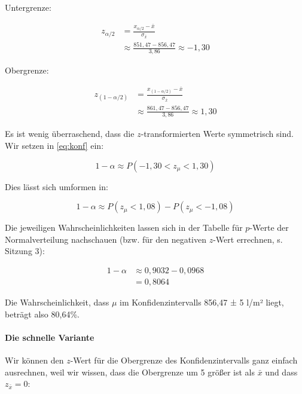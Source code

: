 \documentclass[
  ngerman,
]{article}
\begin{document}
Untergrenze:

\nopagebreak

\[\begin{aligned}
z_{\alpha/2} &= \frac{x_{\alpha/2}-\bar{x}}{\sigma_{\bar{x}}}\\[4pt]
&\approx\frac{851{,}47-856,47}{3,86}\approx-1,30
\end{aligned}\]

Obergrenze:

\nopagebreak

\[\begin{aligned}
z_{(1-\alpha/2)} &= \frac{x_{(1-\alpha/2)}-\bar{x}}{\sigma_{\bar{x}}}\\[4pt]
&\approx\frac{861{,}47-856,47}{3,86}\approx1,30
\end{aligned}\]

Es ist wenig überraschend, dass die \(z\)-transformierten Werte symmetrisch sind. Wir setzen in \autoref{eq:konf} ein:

\nopagebreak

\[
1-\alpha\approx P(-1{,}30 <z_{\mu} < 1{,}30)
\]

Dies lässt sich umformen in:

\nopagebreak

\[
1-\alpha\approx P(z_{\mu}<1{,}08) - P(z_{\mu}<-1{,}08) 
\]

Die jeweiligen Wahrscheinlichkeiten lassen sich in der Tabelle für \(p\)-Werte der Normalverteilung nachschauen (bzw. für den negativen \(z\)-Wert errechnen, s. Sitzung 3):

\nopagebreak

\[\begin{aligned}
1-\alpha&\approx 0,9032 - 0,0968\\[4pt]
&=0,8064
\end{aligned}\]

Die Wahrscheinlichkeit, dass \(\mu\) im Konfidenzintervalls 856,47 ± 5 l/m² liegt, beträgt also 80,64\%.

\hypertarget{die-schnelle-variante}{%
\paragraph{Die schnelle Variante}\label{die-schnelle-variante}}

Wir können den \(z\)-Wert für die Obergrenze des Konfidenzintervalls ganz einfach ausrechnen, weil wir wissen, dass die Obergrenze um 5 größer ist als \(\bar{x}\) und dass \(z_{\bar{x}}=0\):

\nopagebreak
\end{document}
